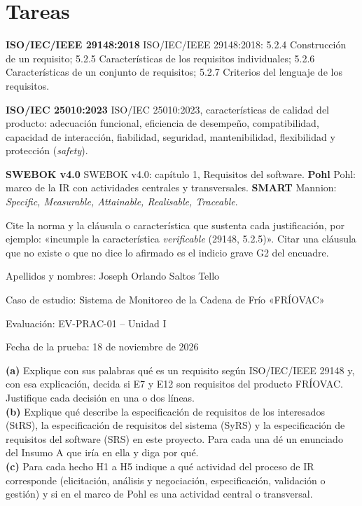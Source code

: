 \documentclass[11pt]{article}
\newcommand{\seccion}[1]{\section{\textcolor{utegreendk}{#1}}}
\begin{document}
	\seccion{Tareas}
	
	\begin{cajaclave}[title={Referencias que puede citar (sin consultar los documentos)}]
		\textbf{ISO/IEC/IEEE 29148:2018} ISO/IEC/IEEE 29148:2018: 5.2.4 Construcción de un requisito; 5.2.5 Características de los requisitos individuales; 5.2.6 Características de un conjunto de requisitos; 5.2.7 Criterios del lenguaje de los requisitos.\par
		\textbf{ISO/IEC 25010:2023} ISO/IEC 25010:2023, características de calidad del producto: adecuación funcional, eficiencia de desempeño, compatibilidad, capacidad de interacción, fiabilidad, seguridad, mantenibilidad, flexibilidad y protección (\emph{safety}).\par
		\textbf{SWEBOK v4.0} SWEBOK v4.0: capítulo 1, Requisitos del software. \textbf{Pohl} Pohl: marco de la IR con actividades centrales y transversales. \textbf{SMART} Mannion: \emph{Specific, Measurable, Attainable, Realisable, Traceable}.\par
		Cite la norma y la cláusula o característica que sustenta cada justificación, por ejemplo: «incumple la característica \emph{verificable} (29148, 5.2.5)». Citar una cláusula que no existe o que no dice lo afirmado es el indicio grave G2 del encuadre.
	\end{cajaclave}
	
	\begin{cajarespuesta}[title={Datos del estudiante y referencias de la prueba}]
		Apellidos y nombres: Joseph Orlando Saltos Tello
		
		Caso de estudio: Sistema de Monitoreo de la Cadena de Frío «FRÍOVAC»
		
		Evaluación: EV-PRAC-01 -- Unidad I
		
		Fecha de la prueba: 18 de noviembre de 2026
	\end{cajarespuesta}
	
	\begin{cajatarea}[title={T1. Conceptos aplicados al caso \hfill D1 · 10\,\%}]
		\textbf{(a)} Explique con sus palabras qué es un requisito según ISO/IEC/IEEE 29148 y, con esa explicación, decida si E7 y E12 son requisitos del producto FRÍOVAC. Justifique cada decisión en una o dos líneas.\\[4pt]
		\textbf{(b)} Explique qué describe la especificación de requisitos de los interesados (StRS), la especificación de requisitos del sistema (SyRS) y la especificación de requisitos del software (SRS) en este proyecto. Para cada una dé un enunciado del Insumo A que iría en ella y diga por qué.\\[4pt]
		\textbf{(c)} Para cada hecho H1 a H5 indique a qué actividad del proceso de IR corresponde (elicitación, análisis y negociación, especificación, validación o gestión) y si en el marco de Pohl es una actividad central o transversal.
	\end{cajatarea}
	
\end{document}
